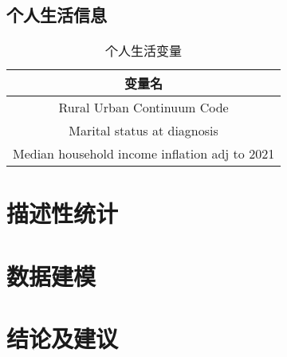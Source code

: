 \documentclass{ctexart}
\begin{document}
        \subsection{个人生活信息}
        \begin{table}[hbtp]
            \centering
            \begin{tabular}{c}
                \hline
                变量名 \\
                \hline
                Rural Urban Continuum Code \\
                Marital status at diagnosis \\
                Median household income inflation adj to 2021 \\
                \hline
            \end{tabular}
            \caption{个人生活变量}
            \label{tab:personal-information}
        \end{table}

        \subsection{}
    \section{描述性统计}

    \section{数据建模}

    \section{结论及建议}

    \newpage
    
     
\end{document}
